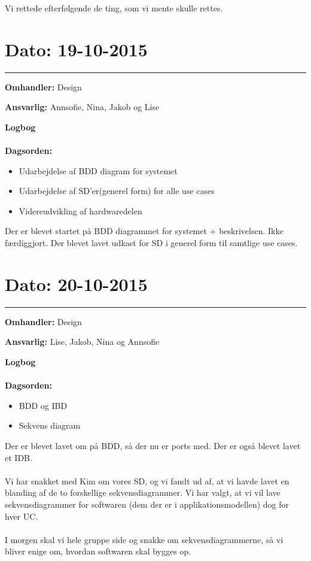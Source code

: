 Vi rettede efterfølgende de ting, som vi mente skulle rettes.

	

\section{Dato: 19-10-2015 }
\hrule

\textbf{Omhandler:} Design 

\textbf{Ansvarlig:} Annsofie, Nina, Jakob og Lise

\textbf{Logbog}
\\
\\
\textbf{Dagsorden:}
\begin{itemize}
	\item Udarbejdelse af BDD diagram for systemet
	\item Udarbejdelse af SD'er(generel form) for alle use cases
	\item Videreudvikling af hardwaredelen
\end{itemize}

Der er blevet startet på BDD diagrammet for systemet + beskrivelsen. Ikke færdiggjort.
Der blevet lavet udkast for SD i generel form til samtlige use cases. 



\section{Dato: 20-10-2015 }
\hrule

\textbf{Omhandler:} Design 

\textbf{Ansvarlig:} Lise, Jakob, Nina og Annsofie

\textbf{Logbog}
\\
\\
\textbf{Dagsorden:}
\begin{itemize}
	\item BDD og IBD
	\item Sekvens diagram
\end{itemize}

Der er blevet lavet om på BDD, så der nu er ports med. Der er også blevet lavet et IDB. 
\\ \\
Vi har snakket med Kim om vores SD, og vi fandt ud af, at vi havde lavet en blanding af de to forskellige sekvensdiagrammer. Vi har valgt, at vi vil lave sekvensdiagrammer for softwaren (dem der er i applikationsmodellen) dog for hver UC.
\\ \\
I morgen skal vi hele gruppe side og snakke om sekvensdiagrammerne, så vi bliver enige om, hvordan softwaren skal bygges op.  
	

